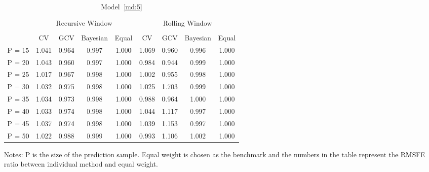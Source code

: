 \begin{table}
\caption{Model~\ref{md:5}} \label{tb:12}
\centering
\begin{adjustbox}{keepaspectratio}
\begin{threeparttable}
\begin{tabular}{lcccccccc}
\toprule
 & \multicolumn{4}{c}{Recursive Window} & \multicolumn{4}{c}{Rolling Window}\\%
\cmidrule(r){2-5}
\cmidrule(r){6-9}\\
       & CV & GCV & Bayesian & Equal & CV & GCV & Bayesian & Equal \\
P = 15 &1.041 &0.964 &0.997 & 1.000& 1.069& 0.960& 0.996& 1.000\\
P = 20 &1.043 &0.960 &0.997 & 1.000& 0.984& 0.944& 0.999& 1.000\\
P = 25 &1.017 &0.967 &0.998 & 1.000& 1.002& 0.955& 0.998& 1.000\\
P = 30 &1.032 &0.975 &0.998 & 1.000& 1.025& 1.703& 0.999& 1.000\\
P = 35 &1.034 &0.973 &0.998 & 1.000& 0.988& 0.964& 1.000& 1.000\\
P = 40 &1.033 &0.974 &0.998 & 1.000& 1.044& 1.117& 0.997& 1.000\\
P = 45 &1.037 &0.974 &0.998 & 1.000& 1.039& 1.153& 0.997& 1.000\\
P = 50 &1.022 &0.988 &0.999 & 1.000& 0.993& 1.106& 1.002& 1.000\\
\bottomrule
\end{tabular}
\begin{tablenotes} \footnotesize
Notes: $\mathrm{P}$ is the size of the prediction sample. Equal weight is chosen as the benchmark and the numbers in the table represent the RMSFE ratio between individual method and equal weight.
\end{tablenotes}
\end{threeparttable}
\end{adjustbox}
\end{table} 